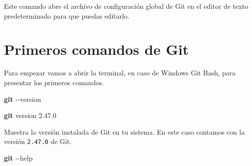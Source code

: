 \documentclass[
]{book}
\newenvironment{Shaded}{\begin{snugshade}}{\end{snugshade}}
\newcommand{\AttributeTok}[1]{\textcolor[rgb]{0.13,0.29,0.53}{#1}}
\newcommand{\FunctionTok}[1]{\textcolor[rgb]{0.13,0.29,0.53}{\textbf{#1}}}
\newcommand{\NormalTok}[1]{#1}
\begin{document}
Este comando abre el archivo de configuración global de Git en el editor de texto predeterminado para que puedas editarlo.

\section{Primeros comandos de Git}\label{primeros-comandos-de-git}

Para empezar vamos a abrir la terminal, en caso de Windows Git Bash, para presentar los primeros comandos.

\begin{Shaded}
\begin{Highlighting}[]
\FunctionTok{git} \AttributeTok{{-}{-}version}
\end{Highlighting}
\end{Shaded}

\begin{Shaded}
\begin{Highlighting}[]
\FunctionTok{git}\NormalTok{ version 2.47.0}
\end{Highlighting}
\end{Shaded}

Muestra la versión instalada de Git en tu sistema. En este caso contamos con la versión \texttt{2.47.0} de Git.

\begin{Shaded}
\begin{Highlighting}[]
\FunctionTok{git} \AttributeTok{{-}{-}help}
\end{Highlighting}
\end{Shaded}
\end{document}
